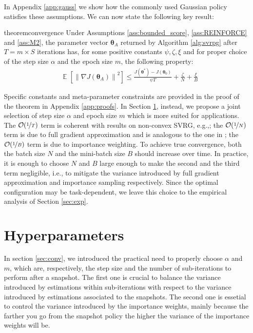 \documentclass{article}
\makeatletter
\theoremstyle{remark}
\theoremstyle{definition}
\DeclareRobustCommand{\eg}{e.g.,\@\xspace}
\DeclareRobustCommand{\ie}{i.e.,\@\xspace}
\DeclareMathOperator*{\EV}{\mathbb{E}}
\newcommand{\EVV}[2][\ppvect \in \ppspace]{\EV_{#1}\left[{#2}\right]}
\newcommand{\norm}[2][\infty]{\left\|#2\right\|_{#1}}
\newcommand{\vtheta}{\boldsymbol{\theta}}
\makeatother
\begin{document}
In Appendix \ref{app:gauss} we show how the commonly used Gaussian policy satisfies these assumptions.
We can now state the following key result:
\begin{restatable}{theorem}{convergence}\label{theo:convergence}
Under Assumptions \ref{ass:bounded_score}, \ref{ass:REINFORCE} and \ref{ass:M2}, the parameter vector $\vtheta_A$ returned by Algorithm \ref{alg:svrpg} after $T=m\times S$ iterations has, for some positive constants $\psi,\zeta, \xi$ and for proper choice of the step size $\alpha$ and the epoch size $m$, the following property:
\begin{align*}
	&\EVV[]
	{\norm[]{\nabla J(\vtheta_A)}^2} 
		\leq
		\frac{J(\vtheta^*)-J(\vtheta_0)}{\psi T} +
		\frac{\zeta}{N}
		+\frac{\xi}{B}
\end{align*}
\end{restatable}
Specific constants and meta-parameter constraints are provided in the proof of the theorem in Appendix \ref{app:proofs}. In Section \ref{sec:stopping}, instead, we propose a joint selection of step size $\alpha$ and epoch size $m$ which is more suited for applications. 
The $\mathcal{O}(\nicefrac{1}{T})$ term is coherent with results on non-convex SVRG, \eg \cite{reddi2016stochastic}; the $\mathcal{O}(\nicefrac{1}{N})$ term is due to full gradient approximation and is analogous to the one in \cite{harikandeh2015stopwasting}; the $\mathcal{O}(\nicefrac{1}{B})$ term is due to importance weighting. To achieve true convergence, both the batch size $N$ and the mini-batch size $B$ should increase over time. In practice, it is enough to choose $N$ and $B$ large enough to make the second and the third term negligible, \ie to mitigate the variance introduced by full gradient approximation and importance sampling respectively. Since the optimal configuration may be task-dependent, we leave this choice to the empirical analysis of Section \ref{sec:exp}. 

\section{Hyperparameters}\label{sec:stopping}
In section \ref{sec:conv}, we introduced the practical need to properly choose $\alpha$ and $m$, which are, respectively, the step size and the number of sub-iterations to perform after a snapshot. The first one is crucial to balance the variance introduced by estimations within sub-iterations with respect to the variance introduced by estimations associated to the snapshots. The second one is essetial to control the variance introduced by the importance weights, mainly because the farther you go from the snapshot policy the higher the variance of the importance weights will be.    
\end{document}
